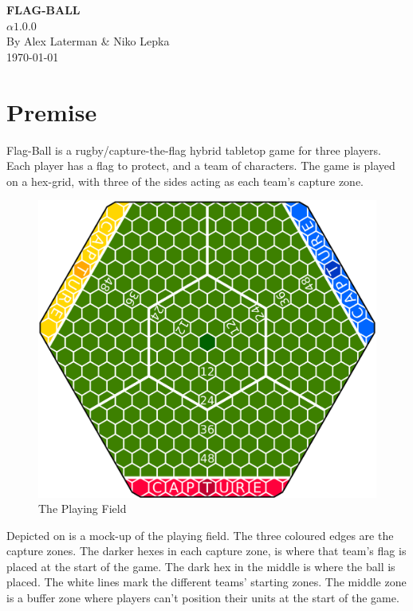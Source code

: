 \documentclass[a4paper]{book}
\begin{document}
\begin{titlepage}
\begin{center}
    \huge{\textbf{FLAG-BALL}}\\
    \LARGE{
        $\alpha1.0.0$\\
        By Alex Laterman \& Niko Lepka
    }\\
    \Large{\today}
\end{center}
\end{titlepage}
\thispagestyle{empty} %
\frontmatter %

\section*{Premise}
Flag-Ball is a rugby/capture-the-flag hybrid tabletop game for three players.
Each player has a flag to protect, and a team of characters.
The game is played on a hex-grid, with three of the sides acting as each team's capture zone.
\begin{figure}
    \centering
    \includegraphics[width=\textwidth]{graphics/board-2}
    \caption{The Playing Field}
    \label{fig:court}
\end{figure}
Depicted on  is a mock-up of the playing field.
The three coloured edges are the capture zones.
The darker hexes in each capture zone, is where that team's flag is placed at the start of the game.
The dark hex in the middle is where the ball is placed.
The white lines mark the different teams' starting zones.
The middle zone is a buffer zone where players can’t position their units at the start of the game.
\end{document}
